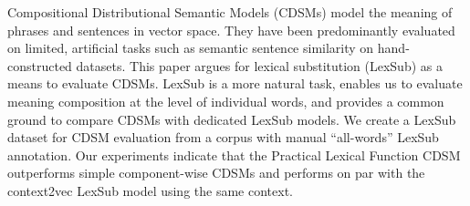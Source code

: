 Compositional Distributional Semantic Models (CDSMs) model the meaning of phrases and sentences in vector space. They have been predominantly evaluated on limited, artificial tasks such as semantic sentence similarity on hand-constructed datasets. This paper argues for lexical substitution (LexSub) as a means to evaluate CDSMs. LexSub is a more natural task, enables us to evaluate meaning composition at the level of individual words, and provides a common ground to compare CDSMs with dedicated LexSub models. We create a LexSub dataset for CDSM evaluation from a corpus with manual ``all-words'' LexSub annotation. Our experiments indicate that the Practical Lexical Function CDSM outperforms simple component-wise CDSMs and performs on par with the context2vec LexSub model using the same context.
